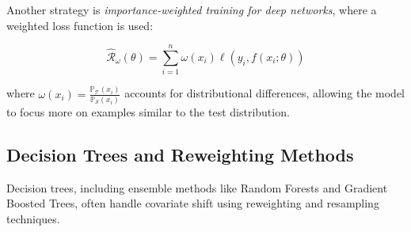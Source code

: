 Another strategy is \emph{importance-weighted training for deep networks}, where a weighted loss function is used:

\begin{equation}
    \hat{\mathcal{R}}_\omega(\theta) = \sum_{i=1}^n \omega(x_i) \ell(y_i, f(x_i; \theta))
    \label{eqn:5.8}
\end{equation}

where $\omega(x_i) = \frac{\mathbb{P}_{\mathcal{T}}(x_i)}{\mathbb{P}_{\mathcal{S}}(x_i)}$ accounts for distributional differences, allowing the model to focus more on examples similar to the test distribution.

\subsection{Decision Trees and Reweighting Methods}

Decision trees, including ensemble methods like Random Forests and Gradient Boosted Trees, often handle covariate shift using reweighting and resampling techniques.

